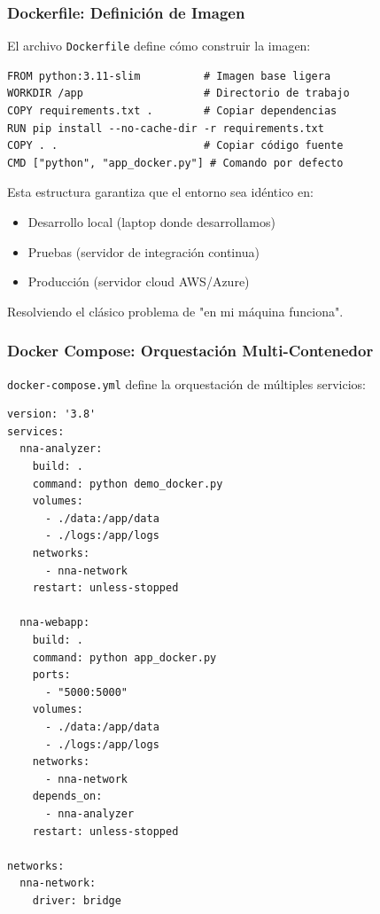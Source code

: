 \subsubsection{Dockerfile: Definición de Imagen}
\label{subsubsec:dockerfile}

El archivo \texttt{Dockerfile} define cómo construir la imagen:

\begin{verbatim}
FROM python:3.11-slim          # Imagen base ligera
WORKDIR /app                   # Directorio de trabajo
COPY requirements.txt .        # Copiar dependencias
RUN pip install --no-cache-dir -r requirements.txt
COPY . .                       # Copiar código fuente
CMD ["python", "app_docker.py"] # Comando por defecto
\end{verbatim}

Esta estructura garantiza que el entorno sea idéntico en:
\begin{itemize}
    \item Desarrollo local (laptop donde desarrollamos)
    \item Pruebas (servidor de integración continua)
    \item Producción (servidor cloud AWS/Azure)
\end{itemize}

Resolviendo el clásico problema de "en mi máquina funciona".

\subsubsection{Docker Compose: Orquestación Multi-Contenedor}
\label{subsubsec:docker_compose}

\texttt{docker-compose.yml} define la orquestación de múltiples servicios:

\begin{verbatim}
version: '3.8'
services:
  nna-analyzer:
    build: .
    command: python demo_docker.py
    volumes:
      - ./data:/app/data
      - ./logs:/app/logs
    networks:
      - nna-network
    restart: unless-stopped
    
  nna-webapp:
    build: .
    command: python app_docker.py
    ports:
      - "5000:5000"
    volumes:
      - ./data:/app/data
      - ./logs:/app/logs
    networks:
      - nna-network
    depends_on:
      - nna-analyzer
    restart: unless-stopped

networks:
  nna-network:
    driver: bridge
\end{verbatim}

